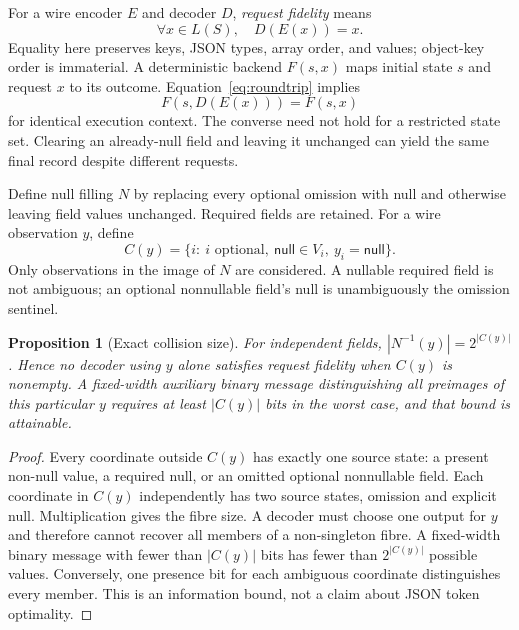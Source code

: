 \documentclass[10pt,twocolumn]{article}
\newtheorem{proposition}{Proposition}
\newcommand{\nul}{\mathsf{null}}
\begin{document}
For a wire encoder $E$ and decoder $D$, \emph{request fidelity} means
\begin{equation}\label{eq:roundtrip}
  \forall x\in L(S),\quad D(E(x))=x.
\end{equation}
Equality here preserves keys, JSON types, array order, and values; object-key order is immaterial. A deterministic backend $F(s,x)$ maps initial state $s$ and request $x$ to its outcome. Equation~\ref{eq:roundtrip} implies
\begin{equation}
 F(s,D(E(x)))=F(s,x)
\end{equation}
for identical execution context. The converse need not hold for a restricted state set. Clearing an already-null field and leaving it unchanged can yield the same final record despite different requests.

Define null filling $N$ by replacing every optional omission with null and otherwise leaving field values unchanged. Required fields are retained. For a wire observation $y$, define
\begin{equation}
 C(y)=\{i:\ i\text{ optional},\ \nul\in V_i,\ y_i=\nul\}.
\end{equation}
Only observations in the image of $N$ are considered. A nullable required field is not ambiguous; an optional nonnullable field's null is unambiguously the omission sentinel.

\begin{proposition}[Exact collision size]\label{prop:fibre}
For independent fields, $|N^{-1}(y)|=2^{|C(y)|}$. Hence no decoder using $y$ alone satisfies request fidelity when $C(y)$ is nonempty. A fixed-width auxiliary binary message distinguishing all preimages of this particular $y$ requires at least $|C(y)|$ bits in the worst case, and that bound is attainable.
\end{proposition}
\begin{proof}
Every coordinate outside $C(y)$ has exactly one source state: a present non-null value, a required null, or an omitted optional nonnullable field. Each coordinate in $C(y)$ independently has two source states, omission and explicit null. Multiplication gives the fibre size. A decoder must choose one output for $y$ and therefore cannot recover all members of a non-singleton fibre. A fixed-width binary message with fewer than $|C(y)|$ bits has fewer than $2^{|C(y)|}$ possible values. Conversely, one presence bit for each ambiguous coordinate distinguishes every member. This is an information bound, not a claim about JSON token optimality.
\end{proof}
\end{document}
